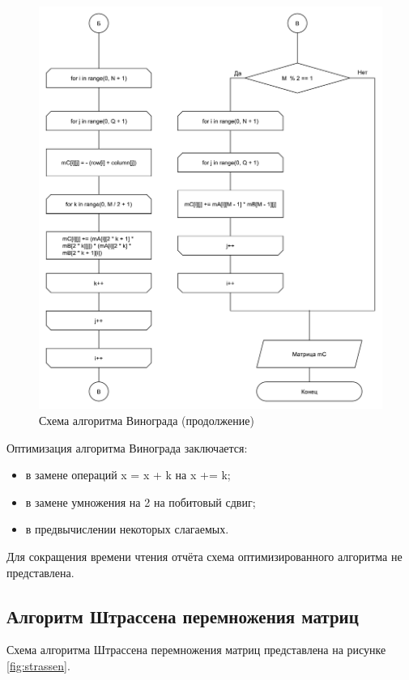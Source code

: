 \begin{figure}
	\centering
	\includegraphics[width=0.9\linewidth]{images/winograd2}
	\caption{Схема алгоритма Винограда (продолжение)}
	\label{fig:winograd2}
\end{figure}

Оптимизация алгоритма Винограда заключается:
\begin{itemize}
	\item в замене операций x = x + k на x += k;
	\item в замене умножения на 2 на побитовый сдвиг;
	\item в предвычислении некоторых слагаемых.
\end{itemize}

Для сокращения времени чтения отчёта схема оптимизированного алгоритма не представлена.

\newpage

\subsection{Алгоритм Штрассена перемножения матриц}

Схема алгоритма Штрассена перемножения матриц представлена на рисунке \ref{fig:strassen}.

